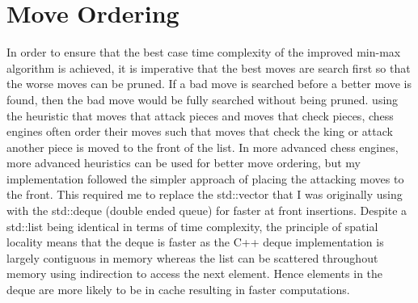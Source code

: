 \section{Move Ordering}
In order to ensure that the best case time complexity of the improved min-max algorithm is achieved, it is imperative that the best moves are search first so that the worse moves can be pruned. If a bad move is searched before a better move is found, then the bad move would be fully searched without being pruned. using the heuristic that moves that attack pieces and moves that check pieces, chess engines often order their moves such that moves that check the king or attack another piece is moved to the front of the list. In more advanced chess engines, more advanced heuristics can be used for better move ordering, but my implementation followed the simpler approach of placing the attacking moves to the front. This required me to replace the std::vector that I was originally using with the std::deque (double ended queue) for faster at front insertions. Despite a std::list being identical in terms of time complexity, the principle of spatial locality means that the deque is faster as the C++ deque implementation is largely contiguous in memory whereas the list can be scattered throughout memory using indirection to access the next element. Hence elements in the deque are more likely to be in cache resulting in faster computations.